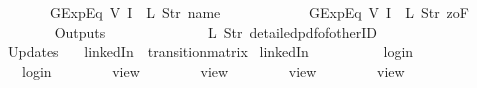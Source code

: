 \begin{isabellebody}
\ \ \ \ \ \ \ \ \ \ \ \ GExp{\isachardot}Eq\ {\isacharparenleft}V\ {\isacharparenleft}I\ {}{\isacharparenright}{\isacharparenright}\ {\isacharparenleft}L\ {\isacharparenleft}Str\ {\isacharprime}{\isacharprime}name{\isacharprime}{\isacharprime}{\isacharparenright}{\isacharparenright}{\isacharcomma}\isanewline
\ \ \ \ \ \ \ \ \ \ \ \ GExp{\isachardot}Eq\ {\isacharparenleft}V\ {\isacharparenleft}I\ {}{\isacharparenright}{\isacharparenright}\ {\isacharparenleft}L\ {\isacharparenleft}Str\ {\isacharprime}{\isacharprime}{}zoF{\isacharprime}{\isacharprime}{\isacharparenright}{\isacharparenright}\isanewline
\ \ \ \ \ \ {\isacharbrackright}{\isacharcomma}\isanewline
\ \ \ \ \ \ Outputs\ {\isacharequal}\ {\isacharbrackleft}\isanewline
\ \ \ \ \ \ \ \ \ \ \ \ {\isacharparenleft}L\ {\isacharparenleft}Str\ {\isacharprime}{\isacharprime}detailed{\isacharunderscore}pdf{\isacharunderscore}of{\isacharunderscore}otherID{\isacharprime}{\isacharprime}{\isacharparenright}{\isacharparenright}\isanewline
\ \ \ \ \ \ {\isacharbrackright}{\isacharcomma}\isanewline
\ \ \ \ \ \ Updates\ {\isacharequal}\ {\isacharbrackleft}{\isacharbrackright}\isanewline
{\isasymrparr}{\isachardoublequoteclose}\isanewline
\isanewline
{}\isamarkupfalse%
\ {\isachardoublequoteopen}linkedIn{\isachardoublequoteclose}\ {\isacharcolon}{\isacharcolon}\ {\isachardoublequoteopen}transition{\isacharunderscore}matrix{\isachardoublequoteclose}\ \isanewline
{\isachardoublequoteopen}linkedIn\ {\isasymequiv}\ {\isacharbraceleft}{\isacharbar}\isanewline
\ \ \ \ \ \ {\isacharparenleft}{\isacharparenleft}{}{\isacharcomma}\ {}{\isacharparenright}{\isacharcomma}\ login{\isacharparenright}{\isacharcomma}\isanewline
\ \ \ \ \ \ {\isacharparenleft}{\isacharparenleft}{}{\isacharcomma}\ {}{\isacharparenright}{\isacharcomma}\ login{}{\isacharparenright}{\isacharcomma}\isanewline
\ \ \ \ \ \ {\isacharparenleft}{\isacharparenleft}{}{\isacharcomma}\ {}{\isacharparenright}{\isacharcomma}\ view{\isacharparenright}{\isacharcomma}\isanewline
\ \ \ \ \ \ {\isacharparenleft}{\isacharparenleft}{}{\isacharcomma}\ {}{\isacharparenright}{\isacharcomma}\ view{}{\isacharparenright}{\isacharcomma}\isanewline
\ \ \ \ \ \ {\isacharparenleft}{\isacharparenleft}{}{\isacharcomma}\ {}{\isacharparenright}{\isacharcomma}\ view{}{\isacharparenright}{\isacharcomma}\isanewline
\ \ \ \ \ \ {\isacharparenleft}{\isacharparenleft}{}{\isacharcomma}\ {}{\isacharparenright}{\isacharcomma}\ view{}{\isacharparenright}{\isacharcomma}\isanewline

\end{isabellebody}
